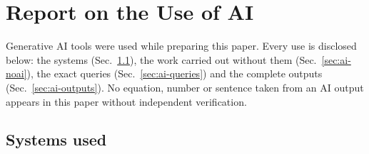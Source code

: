 
\section{Report on the Use of AI}
\label{sec:ai-report}

Generative AI tools were used while preparing this paper. Every use is
disclosed below: the systems (Sec.~\ref{sec:ai-systems}), the work carried
out without them (Sec.~\ref{sec:ai-noai}), the exact queries
(Sec.~\ref{sec:ai-queries}) and the complete outputs
(Sec.~\ref{sec:ai-outputs}). No equation, number or sentence taken from an
AI output appears in this paper without independent verification.

\subsection{Systems used}
\label{sec:ai-systems}

